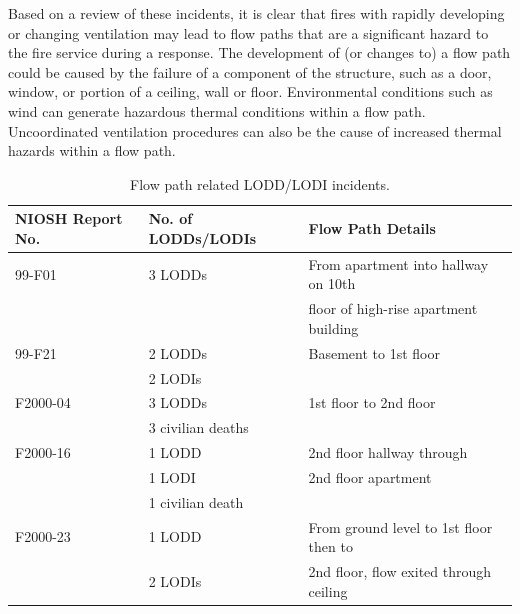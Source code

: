 \documentclass[12pt,oneside]{book}
\begin{document}
Based on a review of these incidents, it is clear that fires with rapidly developing or changing ventilation may lead to flow paths that are a significant hazard to the fire service during a response. The development of (or changes to) a flow path could be caused by the failure of a component of the structure, such as a door, window, or portion of a ceiling, wall or floor. Environmental conditions such as wind can generate hazardous thermal conditions within a flow path. Uncoordinated ventilation procedures can also be the cause of increased thermal hazards within a flow path.

\begin{table}[!ht]
\caption[Flow path related LODD/LODI incidents.]
{Flow path related LODD/LODI incidents.}
\begin{tabular}{lll}
\toprule
NIOSH Report No. & No. of LODDs/LODIs & Flow Path Details                                              \\
\midrule
99-F01   \cite{NIOSH:Pettit}        &  3 LODDs            &  From apartment into hallway on 10th       \\
                                    &                     &  floor of high-rise apartment building     \\
99-F21   \cite{NIOSH:Washenitz}     &  2 LODDs            &  Basement to 1st floor                     \\
                                    &  2 LODIs            &                                            \\
F2000-04 \cite{NIOSH:Mezzanotte}    &  3 LODDs            &  1st floor to 2nd floor                    \\
                                    &  3 civilian deaths  &                                            \\
F2000-16 \cite{NIOSH:McFall}        &  1 LODD             &  2nd floor hallway through                 \\
                                    &  1 LODI             &  2nd floor apartment                       \\
                                    &  1 civilian death   &                                            \\
F2000-23 \cite{NIOSH:McFall2}       &  1 LODD             &  From ground level to 1st floor then to    \\
                                    &  2 LODIs            &  2nd floor, flow exited through ceiling    \\

\end{tabular}
\end{table}
\end{document}
